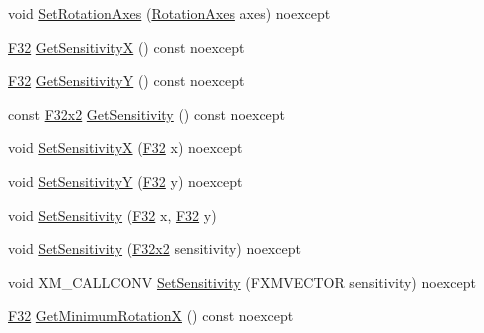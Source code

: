 \begin{DoxyCompactItemize}
\item 
void \mbox{\hyperlink{classmage_1_1script_1_1_mouse_look_script_a82697e11738554a44b4a749227e231ee}{Set\+Rotation\+Axes}} (\mbox{\hyperlink{classmage_1_1script_1_1_mouse_look_script_a662018db64c5dc84a958eb1c6123a829}{Rotation\+Axes}} axes) noexcept
\item 
\mbox{\hyperlink{namespacemage_aa97e833b45f06d60a0a9c4fc22ae02c0}{F32}} \mbox{\hyperlink{classmage_1_1script_1_1_mouse_look_script_a86ee9593f0221bfa259f5ae5dd6edb30}{Get\+SensitivityX}} () const noexcept
\item 
\mbox{\hyperlink{namespacemage_aa97e833b45f06d60a0a9c4fc22ae02c0}{F32}} \mbox{\hyperlink{classmage_1_1script_1_1_mouse_look_script_a39303e2d535ecc610ac4ea2f23825452}{Get\+SensitivityY}} () const noexcept
\item 
const \mbox{\hyperlink{namespacemage_aee4759dedc8def6c6dec26b5c7eddf29}{F32x2}} \mbox{\hyperlink{classmage_1_1script_1_1_mouse_look_script_aba0ebcfb2085d74ee7d6b388d4b0b239}{Get\+Sensitivity}} () const noexcept
\item 
void \mbox{\hyperlink{classmage_1_1script_1_1_mouse_look_script_a97c2564df1660fb9d07f9a4269a77568}{Set\+SensitivityX}} (\mbox{\hyperlink{namespacemage_aa97e833b45f06d60a0a9c4fc22ae02c0}{F32}} x) noexcept
\item 
void \mbox{\hyperlink{classmage_1_1script_1_1_mouse_look_script_a95376c27d55cf12d557427b68ccbd802}{Set\+SensitivityY}} (\mbox{\hyperlink{namespacemage_aa97e833b45f06d60a0a9c4fc22ae02c0}{F32}} y) noexcept
\item 
void \mbox{\hyperlink{classmage_1_1script_1_1_mouse_look_script_a6116637b42e58b8f40de86ed47b54fe3}{Set\+Sensitivity}} (\mbox{\hyperlink{namespacemage_aa97e833b45f06d60a0a9c4fc22ae02c0}{F32}} x, \mbox{\hyperlink{namespacemage_aa97e833b45f06d60a0a9c4fc22ae02c0}{F32}} y)
\item 
void \mbox{\hyperlink{classmage_1_1script_1_1_mouse_look_script_adf611a4d9240e6cf338b665a2713cd9f}{Set\+Sensitivity}} (\mbox{\hyperlink{namespacemage_aee4759dedc8def6c6dec26b5c7eddf29}{F32x2}} sensitivity) noexcept
\item 
void X\+M\+\_\+\+C\+A\+L\+L\+C\+O\+NV \mbox{\hyperlink{classmage_1_1script_1_1_mouse_look_script_a784937d1254fe26ee28864d11956cd80}{Set\+Sensitivity}} (F\+X\+M\+V\+E\+C\+T\+OR sensitivity) noexcept
\item 
\mbox{\hyperlink{namespacemage_aa97e833b45f06d60a0a9c4fc22ae02c0}{F32}} \mbox{\hyperlink{classmage_1_1script_1_1_mouse_look_script_ae594a42302f9ccd47e08070759c3ccf7}{Get\+Minimum\+RotationX}} () const noexcept

\end{DoxyCompactItemize}
